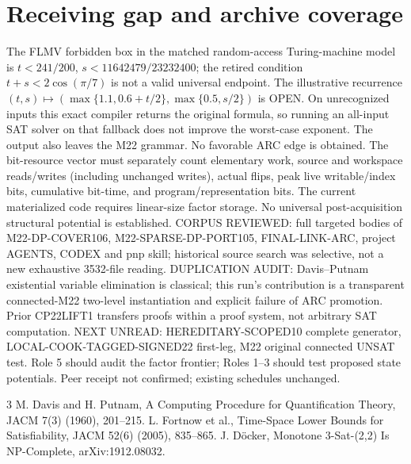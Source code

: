 \documentclass[11pt]{article}
\begin{document}
\section{Receiving gap and archive coverage}
The FLMV forbidden box in the matched random-access Turing-machine model is \(t<241/200\), \(s<11642479/23232400\); the retired condition \(t+s<2\cos(\pi/7)\) is not a valid universal endpoint. The illustrative recurrence \((t,s)\mapsto(\max\{1.1,0.6+t/2\},\max\{0.5,s/2\})\) is OPEN. On unrecognized inputs this exact compiler returns the original formula, so running an all-input SAT solver on that fallback does not improve the worst-case exponent. The output also leaves the M22 grammar. No favorable ARC edge is obtained.
The bit-resource vector must separately count elementary work, source and workspace reads/writes (including unchanged writes), actual flips, peak live writable/index bits, cumulative bit-time, and program/representation bits. The current materialized code requires linear-size factor storage. No universal post-acquisition structural potential is established.
CORPUS REVIEWED: full targeted bodies of M22-DP-COVER106, M22-SPARSE-DP-PORT105, FINAL-LINK-ARC, project AGENTS, CODEX and pnp skill; historical source search was selective, not a new exhaustive 3532-file reading. DUPLICATION AUDIT: Davis--Putnam existential variable elimination is classical; this run's contribution is a transparent connected-M22 two-level instantiation and explicit failure of ARC promotion. Prior CP22LIFT1 transfers proofs within a proof system, not arbitrary SAT computation. NEXT UNREAD: HEREDITARY-SCOPED10 complete generator, LOCAL-COOK-TAGGED-SIGNED22 first-leg, M22 original connected UNSAT test. Role 5 should audit the factor frontier; Roles 1--3 should test proposed state potentials. Peer receipt not confirmed; existing schedules unchanged.
\begin{thebibliography}{3}
 M. Davis and H. Putnam, A Computing Procedure for Quantification Theory, JACM 7(3) (1960), 201--215.
 L. Fortnow et al., Time-Space Lower Bounds for Satisfiability, JACM 52(6) (2005), 835--865.
 J. D\"ocker, Monotone 3-Sat-(2,2) Is NP-Complete, arXiv:1912.08032.
\end{thebibliography}
\end{document}
